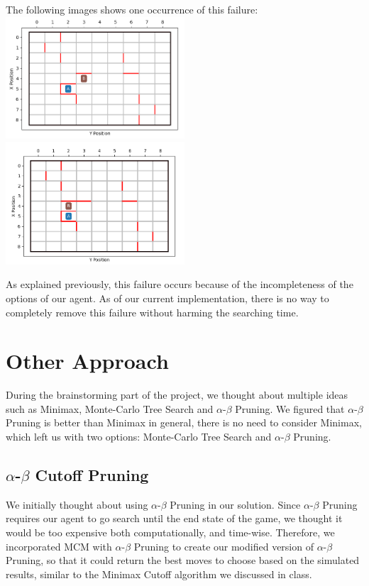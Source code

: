 \documentclass[twoside,11pt]{article}
\begin{document}
The following images shows one occurrence of this failure:\\
\includegraphics[width=0.5\textwidth]{b_skip_1.png}
\includegraphics[width=0.5\textwidth]{b_skip_2.png}

As explained previously, this failure occurs because of the incompleteness of the options of our agent.
As of our current implementation, there is no way to completely remove this failure without harming the searching time.

\section{Other Approach}
During the brainstorming part of the project, we thought about multiple ideas such as Minimax, Monte-Carlo Tree Search and \(\alpha\)-\(\beta\) Pruning.
We figured that \(\alpha\)-\(\beta\) Pruning is better than Minimax in general, there is no need to consider Minimax, which left us with two options: Monte-Carlo Tree Search and \(\alpha\)-\(\beta\) Pruning.

\subsection*{\(\alpha\)-\(\beta\) Cutoff Pruning}
We initially thought about using \(\alpha\)-\(\beta\) Pruning in our solution.
Since \(\alpha\)-\(\beta\) Pruning requires our agent to go search until the end state of the game, we thought it would be too expensive both computationally, and time-wise.
Therefore, we incorporated MCM with \(\alpha\)-\(\beta\) Pruning to create our modified version of \(\alpha\)-\(\beta\) Pruning, so that it could return the best moves to choose based on the simulated results, similar to the Minimax Cutoff algorithm we discussed in class.
\end{document}
